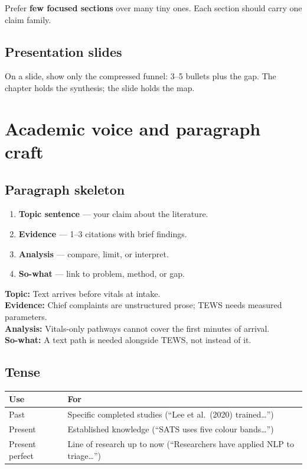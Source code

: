 \documentclass[11pt,a4paper]{article}
\begin{document}
Prefer \textbf{few focused sections} over many tiny ones. Each section should carry one claim family.

\subsection{Presentation slides}
On a slide, show only the compressed funnel: 3--5 bullets plus the gap.
The chapter holds the synthesis; the slide holds the map.

\section{Academic voice and paragraph craft}

\subsection{Paragraph skeleton}
\begin{enumerate}
  \item \textbf{Topic sentence} --- your claim about the literature.
  \item \textbf{Evidence} --- 1--3 citations with brief findings.
  \item \textbf{Analysis} --- compare, limit, or interpret.
  \item \textbf{So-what} --- link to problem, method, or gap.
\end{enumerate}

\begin{examplebox}
\textbf{Topic:} Text arrives before vitals at intake.\\
\textbf{Evidence:} Chief complaints are unstructured prose; TEWS needs measured parameters.\\
\textbf{Analysis:} Vitals-only pathways cannot cover the first minutes of arrival.\\
\textbf{So-what:} A text path is needed alongside TEWS, not instead of it.
\end{examplebox}

\subsection{Tense}
\begin{center}
\begin{tabular}{@{}lp{}@{}}
\toprule
\textbf{Use} & \textbf{For} \\
\midrule
Past & Specific completed studies (``Lee et al.\ (2020) trained\ldots'') \\
Present & Established knowledge (``SATS uses five colour bands\ldots'') \\
Present perfect & Line of research up to now (``Researchers have applied NLP to triage\ldots'') \\
\bottomrule
\end{tabular}
\end{center}
\end{document}
